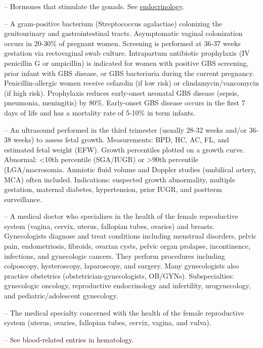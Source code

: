 -- Hormones that stimulate the gonads. See \hyperlink{Endocrinology}{endocrinology}.

-- A gram-positive bacterium (Streptococcus agalactiae) colonizing the genitourinary and gastrointestinal tracts. Asymptomatic vaginal colonization occurs in 20-30\% of pregnant women. Screening is performed at 36-37 weeks gestation via rectovaginal swab culture. Intrapartum antibiotic prophylaxis (IV penicillin G or ampicillin) is indicated for women with positive GBS screening, prior infant with GBS disease, or GBS bacteriuria during the current pregnancy. Penicillin-allergic women receive cefazolin (if low risk) or clindamycin/vancomycin (if high risk). Prophylaxis reduces early-onset neonatal GBS disease (sepsis, pneumonia, meningitis) by 80\%. Early-onset GBS disease occurs in the first 7 days of life and has a mortality rate of 5-10\% in term infants.

-- An ultrasound performed in the third trimester (usually 28-32 weeks and/or 36-38 weeks) to assess fetal growth. Measurements: BPD, HC, AC, FL, and estimated fetal weight (EFW). Growth percentiles plotted on a growth curve. Abnormal: <10th percentile (SGA/IUGR) or >90th percentile (LGA/macrosomia. Amniotic fluid volume and Doppler studies (umbilical artery, MCA) often included. Indications: suspected growth abnormality, multiple gestation, maternal diabetes, hypertension, prior IUGR, and postterm surveillance.

-- A medical doctor who specializes in the health of the female reproductive system (vagina, cervix, uterus, fallopian tubes, ovaries) and breasts. Gynecologists diagnose and treat conditions including menstrual disorders, pelvic pain, endometriosis, fibroids, ovarian cysts, pelvic organ prolapse, incontinence, infections, and gynecologic cancers. They perform procedures including colposcopy, hysteroscopy, laparoscopy, and surgery. Many gynecologists also practice obstetrics (obstetrician-gynecologists, OB/GYNs). Subspecialties: gynecologic oncology, reproductive endocrinology and infertility, urogynecology, and pediatric/adolescent gynecology.

-- The medical specialty concerned with the health of the female reproductive system (uterus, ovaries, fallopian tubes, cervix, vagina, and vulva).

-- See blood-related entries in hematology.

